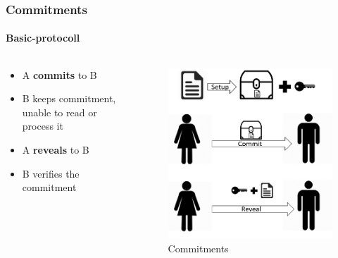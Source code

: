 \begin{frame}
	\frametitle{Commitments}
	\framesubtitle{Basic-protocoll}
	\begin{columns}
		\begin{column}{0.5\textwidth}
			\begin{LARGE}
				\begin{itemize}
					\item A \textbf{commits} to B
					\item B keeps commitment, unable to read or process it
					\item A \textbf{reveals} to B
					\item B verifies the commitment 
				\end{itemize}
			\end{LARGE}
		\end{column}
		\begin{column}{0.5\textwidth}
			\begin{figure}
				\centering
				\includegraphics[width=0.8\linewidth]{Images/protocoll}
				\caption[Commitments]{Commitments}
				\label{fig:protocoll}
			\end{figure}
		\end{column}
	\end{columns}	
\end{frame}

